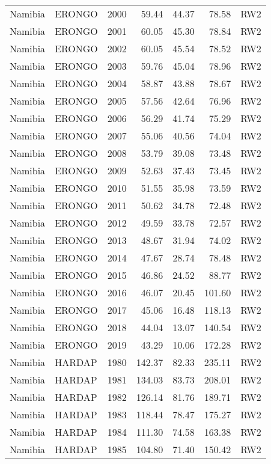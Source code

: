 \begin{longtable}{lllrrrl}
  Namibia & ERONGO & 2000 & 59.44 & 44.37 & 78.58 & RW2 \\ 
  Namibia & ERONGO & 2001 & 60.05 & 45.30 & 78.84 & RW2 \\ 
  Namibia & ERONGO & 2002 & 60.05 & 45.54 & 78.52 & RW2 \\ 
  Namibia & ERONGO & 2003 & 59.76 & 45.04 & 78.96 & RW2 \\ 
  Namibia & ERONGO & 2004 & 58.87 & 43.88 & 78.67 & RW2 \\ 
  Namibia & ERONGO & 2005 & 57.56 & 42.64 & 76.96 & RW2 \\ 
  Namibia & ERONGO & 2006 & 56.29 & 41.74 & 75.29 & RW2 \\ 
  Namibia & ERONGO & 2007 & 55.06 & 40.56 & 74.04 & RW2 \\ 
  Namibia & ERONGO & 2008 & 53.79 & 39.08 & 73.48 & RW2 \\ 
  Namibia & ERONGO & 2009 & 52.63 & 37.43 & 73.45 & RW2 \\ 
  Namibia & ERONGO & 2010 & 51.55 & 35.98 & 73.59 & RW2 \\ 
  Namibia & ERONGO & 2011 & 50.62 & 34.78 & 72.48 & RW2 \\ 
  Namibia & ERONGO & 2012 & 49.59 & 33.78 & 72.57 & RW2 \\ 
  Namibia & ERONGO & 2013 & 48.67 & 31.94 & 74.02 & RW2 \\ 
  Namibia & ERONGO & 2014 & 47.67 & 28.74 & 78.48 & RW2 \\ 
  Namibia & ERONGO & 2015 & 46.86 & 24.52 & 88.77 & RW2 \\ 
  Namibia & ERONGO & 2016 & 46.07 & 20.45 & 101.60 & RW2 \\ 
  Namibia & ERONGO & 2017 & 45.06 & 16.48 & 118.13 & RW2 \\ 
  Namibia & ERONGO & 2018 & 44.04 & 13.07 & 140.54 & RW2 \\ 
  Namibia & ERONGO & 2019 & 43.29 & 10.06 & 172.28 & RW2 \\ 
  Namibia & HARDAP & 1980 & 142.37 & 82.33 & 235.11 & RW2 \\ 
  Namibia & HARDAP & 1981 & 134.03 & 83.73 & 208.01 & RW2 \\ 
  Namibia & HARDAP & 1982 & 126.14 & 81.76 & 189.71 & RW2 \\ 
  Namibia & HARDAP & 1983 & 118.44 & 78.47 & 175.27 & RW2 \\ 
  Namibia & HARDAP & 1984 & 111.30 & 74.58 & 163.38 & RW2 \\ 
  Namibia & HARDAP & 1985 & 104.80 & 71.40 & 150.42 & RW2 \\ 

\end{longtable}
